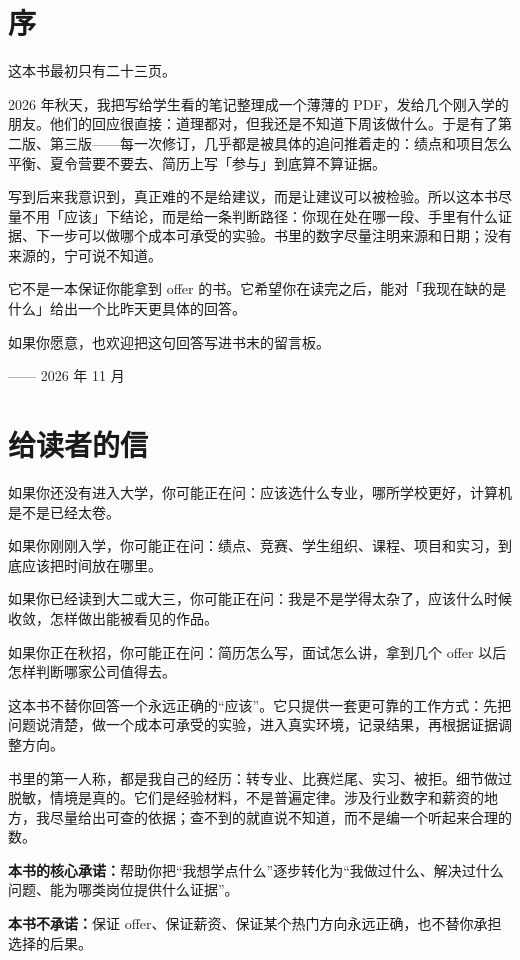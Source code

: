 \documentclass[UTF8,zihao=5,openany]{ctexbook}
\begin{document}
\clearpage
\chapter*{序}
这本书最初只有二十三页。

2026 年秋天，我把写给学生看的笔记整理成一个薄薄的 PDF，发给几个刚入学的朋友。他们的回应很直接：道理都对，但我还是不知道下周该做什么。于是有了第二版、第三版——每一次修订，几乎都是被具体的追问推着走的：绩点和项目怎么平衡、夏令营要不要去、简历上写「参与」到底算不算证据。

写到后来我意识到，真正难的不是给建议，而是让建议可以被检验。所以这本书尽量不用「应该」下结论，而是给一条判断路径：你现在处在哪一段、手里有什么证据、下一步可以做哪个成本可承受的实验。书里的数字尽量注明来源和日期；没有来源的，宁可说不知道。

它不是一本保证你能拿到 offer 的书。它希望你在读完之后，能对「我现在缺的是什么」给出一个比昨天更具体的回答。

如果你愿意，也欢迎把这句回答写进书末的留言板。

\vspace{0.6cm}
\noindent\hfill —— 2026 年 11 月

\chapter*{给读者的信}
如果你还没有进入大学，你可能正在问：应该选什么专业，哪所学校更好，计算机是不是已经太卷。

如果你刚刚入学，你可能正在问：绩点、竞赛、学生组织、课程、项目和实习，到底应该把时间放在哪里。

如果你已经读到大二或大三，你可能正在问：我是不是学得太杂了，应该什么时候收敛，怎样做出能被看见的作品。

如果你正在秋招，你可能正在问：简历怎么写，面试怎么讲，拿到几个 offer 以后怎样判断哪家公司值得去。

这本书不替你回答一个永远正确的“应该”。它只提供一套更可靠的工作方式：先把问题说清楚，做一个成本可承受的实验，进入真实环境，记录结果，再根据证据调整方向。

书里的第一人称，都是我自己的经历：转专业、比赛烂尾、实习、被拒。细节做过脱敏，情境是真的。它们是经验材料，不是普遍定律。涉及行业数字和薪资的地方，我尽量给出可查的依据；查不到的就直说不知道，而不是编一个听起来合理的数。

\begin{keybox}
\textbf{本书的核心承诺：}帮助你把“我想学点什么”逐步转化为“我做过什么、解决过什么问题、能为哪类岗位提供什么证据”。

\textbf{本书不承诺：}保证 offer、保证薪资、保证某个热门方向永远正确，也不替你承担选择的后果。
\end{keybox}
\end{document}
